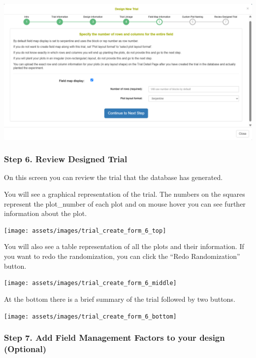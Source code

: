 \documentclass[
  12pt,
]{book}
\begin{document}
\begin{center}\includegraphics[width=0.95\linewidth]{assets/images/trial_create_form_5} \end{center}

\hypertarget{step-6.-review-designed-trial}{%
\subsubsection*{Step 6. Review Designed Trial}\label{step-6.-review-designed-trial}}


On this screen you can review the trial that the database has generated.

You will see a graphical representation of the trial. The numbers on the squares represent the plot\_number of each plot and on mouse hover you can see further information about the plot.

\begin{center}\texttt{[image: assets/images/trial\_create\_form\_6\_top]} \end{center}

You will also see a table representation of all the plots and their information. If you want to redo the randomization, you can click the ``Redo Randomization'' button.

\begin{center}\texttt{[image: assets/images/trial\_create\_form\_6\_middle]} \end{center}

At the bottom there is a brief summary of the trial followed by two buttons.

\begin{center}\texttt{[image: assets/images/trial\_create\_form\_6\_bottom]} \end{center}

\hypertarget{step-7.-add-field-management-factors-to-your-design-optional}{%
\subsubsection*{Step 7. Add Field Management Factors to your design (Optional)}\label{step-7.-add-field-management-factors-to-your-design-optional}}
\end{document}
